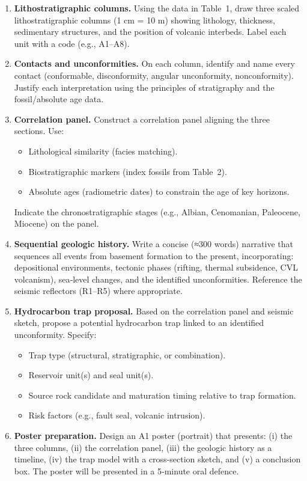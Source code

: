 \documentclass[11pt]{article}
\newcounter{popsec}
\newcounter{popsub}
\newcommand{\courssub}[1]{%
  \stepcounter{popsub}%
  \par\vspace{9pt}\noindent{\popxbold\fontsize{11.5}{13}\selectfont\color{popink}{\color{poporange}\thepopsec.\thepopsub}\hspace{6pt}#1}\par\nopagebreak\vspace{4pt}
}
\begin{document}
\begin{experience}
\courssub{Tasks}
\begin{enumerate}
    \item \textbf{Lithostratigraphic columns.} Using the data in Table~1, draw three scaled lithostratigraphic columns (1 cm = 10 m) showing lithology, thickness, sedimentary structures, and the position of volcanic interbeds. Label each unit with a code (e.g., A1–A8).
    \item \textbf{Contacts and unconformities.} On each column, identify and name every contact (conformable, disconformity, angular unconformity, nonconformity). Justify each interpretation using the principles of stratigraphy and the fossil/absolute age data.
    \item \textbf{Correlation panel.} Construct a correlation panel aligning the three sections. Use:
        \begin{itemize}
            \item Lithological similarity (facies matching).
            \item Biostratigraphic markers (index fossils from Table~2).
            \item Absolute ages (radiometric dates) to constrain the age of key horizons.
        \end{itemize}
        Indicate the chronostratigraphic stages (e.g., Albian, Cenomanian, Paleocene, Miocene) on the panel.
    \item \textbf{Sequential geologic history.} Write a concise (≈300 words) narrative that sequences all events from basement formation to the present, incorporating: depositional environments, tectonic phases (rifting, thermal subsidence, CVL volcanism), sea‑level changes, and the identified unconformities. Reference the seismic reflectors (R1–R5) where appropriate.
    \item \textbf{Hydrocarbon trap proposal.} Based on the correlation panel and seismic sketch, propose a potential hydrocarbon trap linked to an identified unconformity. Specify:
        \begin{itemize}
            \item Trap type (structural, stratigraphic, or combination).
            \item Reservoir unit(s) and seal unit(s).
            \item Source rock candidate and maturation timing relative to trap formation.
            \item Risk factors (e.g., fault seal, volcanic intrusion).
        \end{itemize}
    \item \textbf{Poster preparation.} Design an A1 poster (portrait) that presents: (i) the three columns, (ii) the correlation panel, (iii) the geologic history as a timeline, (iv) the trap model with a cross‑section sketch, and (v) a conclusion box. The poster will be presented in a 5‑minute oral defence.
\end{enumerate}
\end{experience}
\end{document}
